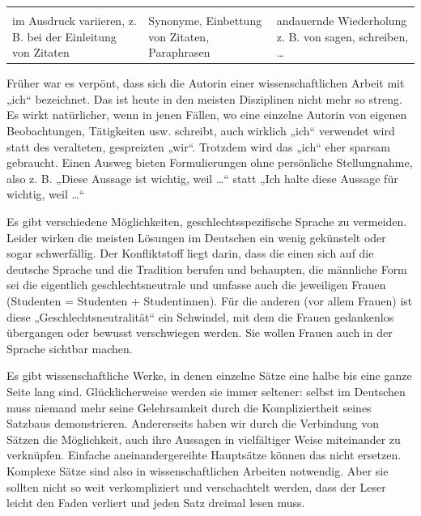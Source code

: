\documentclass[]{book}
\theoremstyle{definition}
\theoremstyle{definition}
\theoremstyle{definition}
\theoremstyle{remark}
\begin{document}
\begin{longtable}[]{@{}lll@{}}
\begin{minipage}[t]{0.39\columnwidth}
\vspace{-6mm}\strut
\end{minipage}\tabularnewline
\begin{minipage}[t]{0.11\columnwidth}\raggedright\strut
im Ausdruck variieren, z. B. bei der Einleitung von Zitaten\strut
\end{minipage} & \begin{minipage}[t]{0.42\columnwidth}\raggedright\strut
Synonyme, Einbettung von Zitaten, Paraphrasen\strut
\end{minipage} & \begin{minipage}[t]{0.39\columnwidth}\raggedright\strut
andauernde Wiederholung z. B. von sagen, schreiben, \ldots{}\strut
\end{minipage}\tabularnewline
\bottomrule
\end{longtable}

Früher war es verpönt, dass sich die Autorin einer wissenschaftlichen
Arbeit mit „ich`` bezeichnet. Das ist heute in den meisten Disziplinen
nicht mehr so streng. Es wirkt natürlicher, wenn in jenen Fällen, wo
eine einzelne Autorin von eigenen Beobachtungen, Tätigkeiten usw.
schreibt, auch wirklich „ich`` verwendet wird statt des veralteten,
gespreizten „wir``. Trotzdem wird das „ich`` eher sparsam gebraucht.
Einen Ausweg bieten Formulierungen ohne persönliche Stellungnahme, also
z. B. „Diese Aussage ist wichtig, weil \ldots{}`` statt „Ich halte diese
Aussage für wichtig, weil \ldots{}``

Es gibt verschiedene Möglichkeiten, geschlechtsspezifische Sprache zu
vermeiden. Leider wirken die meisten Lösungen im Deutschen ein wenig
gekünstelt oder sogar schwerfällig. Der Konfliktstoff liegt darin, dass
die einen sich auf die deutsche Sprache und die Tradition berufen und
behaupten, die männliche Form sei die eigentlich geschlechtsneutrale und
umfasse auch die jeweiligen Frauen (Studenten = Studenten +
Studentinnen). Für die anderen (vor allem Frauen) ist diese
„Geschlechtsneutralität`` ein Schwindel, mit dem die Frauen gedankenlos
übergangen oder bewusst verschwiegen werden. Sie wollen Frauen auch in
der Sprache sichtbar machen.

Es gibt wissenschaftliche Werke, in denen einzelne Sätze eine halbe bis
eine ganze Seite lang sind. Glücklicherweise werden sie immer seltener:
selbst im Deutschen muss niemand mehr seine Gelehrsamkeit durch die
Kompliziertheit seines Satzbaus demonstrieren. Andererseits haben wir
durch die Verbindung von Sätzen die Möglichkeit, auch ihre Aussagen in
vielfältiger Weise miteinander zu verknüpfen. Einfache
aneinandergereihte Hauptsätze können das nicht ersetzen. Komplexe Sätze
sind also in wissenschaftlichen Arbeiten notwendig. Aber sie sollten
nicht so weit verkompliziert und verschachtelt werden, dass der Leser
leicht den Faden verliert und jeden Satz dreimal lesen muss.
\end{document}
